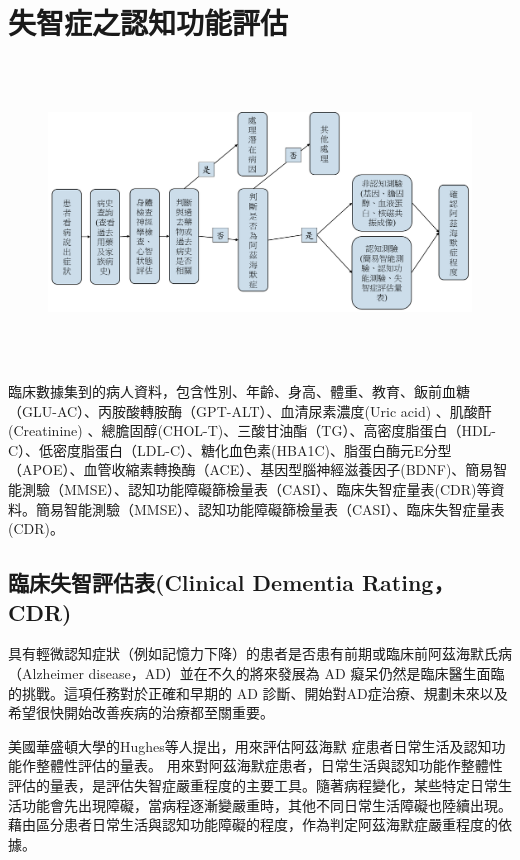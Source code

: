 
\chapter{失智症之認知功能評估}
\label{chapter:intro}


\begin{figure}[H]
	\centering
	\centerline{\includegraphics[height=8cm]{pic/ADprocess.PNG}}
	\label{fig:ADProcess}
\end{figure}
臨床數據集到的病人資料，包含性別、年齡、身高、體重、教育、飯前血糖（GLU-AC）、丙胺酸轉胺酶（GPT-ALT）、血清尿素濃度(Uric acid) 、肌酸酐(Creatinine) 、總膽固醇(CHOL-T)、三酸甘油酯（TG）、高密度脂蛋白（HDL-C）、低密度脂蛋白（LDL-C）、糖化血色素(HBA1C)、脂蛋白酶元E分型（APOE）、血管收縮素轉換酶（ACE）、基因型腦神經滋養因子(BDNF)、簡易智能測驗（MMSE）、認知功能障礙篩檢量表（CASI）、臨床失智症量表(CDR)等資料。簡易智能測驗（MMSE）、認知功能障礙篩檢量表（CASI）、臨床失智症量表(CDR)。

\section{臨床失智評估表(Clinical Dementia Rating，CDR)}

具有輕微認知症狀（例如記憶力下降）的患者是否患有前期或臨床前阿茲海默氏病（Alzheimer disease，AD）並在不久的將來發展為 AD 癡呆仍然是臨床醫生面臨的挑戰。這項任務對於正確和早期的 AD 診斷、開始對AD症治療、規劃未來以及希望很快開始改善疾病的治療都至關重要。

美國華盛頓大學的Hughes等人提出，用來評估阿茲海默 症患者日常生活及認知功能作整體性評估的量表。
用來對阿茲海默症患者，日常生活與認知功能作整體性評估的量表，是評估失智症嚴重程度的主要工具。隨著病程變化，某些特定日常生活功能會先出現障礙，當病程逐漸變嚴重時，其他不同日常生活障礙也陸續出現。藉由區分患者日常生活與認知功能障礙的程度，作為判定阿茲海默症嚴重程度的依據。


